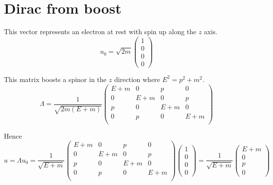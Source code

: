 



\section*{Dirac from boost}

This vector represents an electron at rest with spin up along the $z$ axis.
\begin{equation*}
u_0=\sqrt{2m}\begin{pmatrix}1\\0\\0\\0\end{pmatrix}
\end{equation*}

This matrix boosts a spinor in the $z$ direction where $E^2=p^2+m^2$.
\begin{equation*}
\Lambda=\frac{1}{\sqrt{2m(E+m)}}
\begin{pmatrix}
E+m & 0 & p & 0\\
0 & E+m & 0 & p\\
p & 0 & E+m & 0\\
0 & p & 0 & E+m\\
\end{pmatrix}
\end{equation*}

Hence
\begin{equation*}
u=\Lambda u_0=\frac{1}{\sqrt{E+m}}
\begin{pmatrix}
E+m & 0 & p & 0\\
0 & E+m & 0 & p\\
p & 0 & E+m & 0\\
0 & p & 0 & E+m\\
\end{pmatrix}
\begin{pmatrix}1\\0\\0\\0\end{pmatrix}
=\frac{1}{\sqrt{E+m}}\begin{pmatrix}E+m\\0\\p\\0\end{pmatrix}
\end{equation*}

